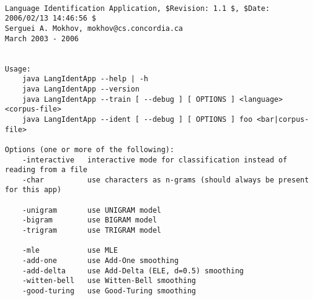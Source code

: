 \begin{verbatim}

Language Identification Application, $Revision: 1.1 $, $Date: 2006/02/13 14:46:56 $
Serguei A. Mokhov, mokhov@cs.concordia.ca
March 2003 - 2006


Usage:
    java LangIdentApp --help | -h
    java LangIdentApp --version
    java LangIdentApp --train [ --debug ] [ OPTIONS ] <language> <corpus-file>
    java LangIdentApp --ident [ --debug ] [ OPTIONS ] foo <bar|corpus-file>

Options (one or more of the following):
    -interactive   interactive mode for classification instead of reading from a file
    -char          use characters as n-grams (should always be present for this app)

    -unigram       use UNIGRAM model
    -bigram        use BIGRAM model
    -trigram       use TRIGRAM model

    -mle           use MLE
    -add-one       use Add-One smoothing
    -add-delta     use Add-Delta (ELE, d=0.5) smoothing
    -witten-bell   use Witten-Bell smoothing
    -good-turing   use Good-Turing smoothing

\end{verbatim}
